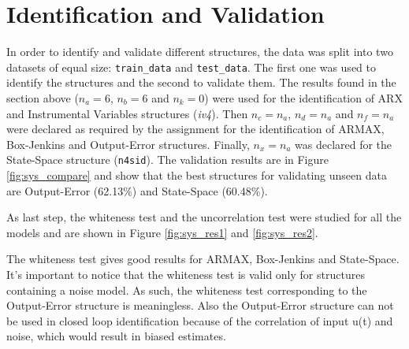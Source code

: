 \documentclass[a4paper,11pt]{article}
\begin{document}
\section{Identification and Validation}




In order to identify and validate different structures, the data was split into two datasets of equal size: \texttt{train\_data} and \texttt{test\_data}. The first one was used to identify the structures and the second to validate them. The results found in the section above ($n_a = 6$, $n_b = 6$ and $n_k = 0$) were used for the identification of ARX and Instrumental Variables structures (\textit{iv4}). Then $n_c = n_a$, $n_d = n_a$ and $n_f = n_a$ were declared as required by the assignment for the identification of ARMAX, Box-Jenkins and Output-Error structures. Finally, $n_x = n_a$ was declared for the State-Space structure (\texttt{n4sid}). The validation results are in Figure \ref{fig:sys_compare} and show that the best structures for validating unseen data are Output-Error (62.13\%) and State-Space (60.48\%).

As last step, the whiteness test and the uncorrelation test were studied for all the models and are shown in Figure \ref{fig:sys_res1} and \ref{fig:sys_res2}. 

The whiteness test gives good results for ARMAX, Box-Jenkins and State-Space. It's important to notice that the whiteness test is valid only for structures containing a noise model. As such, the whiteness test corresponding to the Output-Error structure is meaningless. Also the Output-Error structure can not be used in closed loop identification because of the correlation of input u(t) and noise, which would result in biased estimates.
\end{document}
